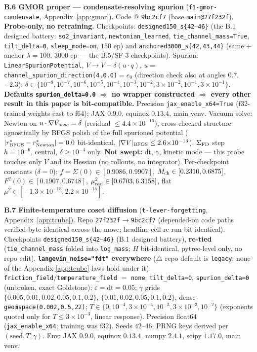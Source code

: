 \documentclass[10pt]{article}
\begin{document}
\textbf{B.6 GMOR proper --- condensate-resolving spurion} (\texttt{f1-gmor-condensate}, Appendix~\ref{app:gmor}). Code @ \texttt{9bc2cf7} (base \texttt{main@27f232f}). \textbf{Probe-only, no retraining.} Checkpoints: \texttt{designed150\_s\{42--46\}} (the B.1 designed battery: \texttt{so2\_invariant}, \texttt{newtonian\_learned}, \texttt{tie\_channel\_mass=True}, \texttt{tilt\_delta=0}, \texttt{sleep\_mode=on}, $150$ ep) and \texttt{anchored3000\_s\{42,43,44\}} (same $+$ anchor $\lambda{=}100$, $3000$ ep --- the B.5/SF-3 checkpoints). Spurion: \texttt{LinearSpurionPotential}, $V\to V-\delta(u\cdot q)$, $u=$\texttt{channel\_spurion\_direction(4,0.0)}$=e_0$ (direction check also at angles $0.7$, $-2.3$); $\delta\in\{10^{-8},10^{-7},10^{-6},10^{-5},10^{-4},10^{-3},10^{-2},3{\times}10^{-2},10^{-1},3{\times}10^{-1}\}$. \textbf{Defaults \texttt{spurion\_delta=0.0} $\Rightarrow$ no wrapper constructed $\Rightarrow$ every other result in this paper is bit-compatible.} Precision \texttt{jax\_enable\_x64=True} (f32-trained weights cast to f64); JAX $0.9.0$, equinox $0.13.4$, main venv. Vacuum solve: Newton on $u\cdot\nabla V_{\rm base}=\delta$ (residual $\le4.4{\times}10^{-16}$), cross-checked structure-agnostically by BFGS polish of the full spurioned potential ($|r^*_{\rm BFGS}-r^*_{\rm Newton}|=0.0$ bit-identical, $|\nabla V|_{\rm BFGS}\le2.6{\times}10^{-13}$). $\Sigma_{\rm FD}$ step $h{=}10^{-6}$, central, $\delta\ge10^{-4}$ only. \textbf{Not swept:} $\mathrm{dt}$, $\gamma$, kinetic mode --- this probe touches only $V$ and its Hessian (no rollouts, no integrator). Per-checkpoint constants ($\delta{=}0$): $f=\Sigma(0)\in[0.9086,0.9907]$, $M_{\rm ch}\in[0.2310,0.6875]$, $F^2(0)\in[0.1907,0.6748]$, $\mu_{\rm rad}^2\in[0.6703,6.3158]$, flat $\mu^2\in[-1.3{\times}10^{-15},2.2{\times}10^{-15}]$.

\textbf{B.7 Finite-temperature coset diffusion} (\texttt{t-lever-forgetting}, Appendix~\ref{app:tcube}). Repo \texttt{27f232f}$\to$\texttt{9bc2cf7} (depended-on code paths verified byte-identical across the move; headline cell re-run bit-identical). Checkpoints \texttt{designed150\_s\{42--46\}} (B.1 designed battery), \textbf{re-tied} (\texttt{tie\_channel\_mass} folded into \texttt{log\_mass}; $H$ bit-identical, pytree-level only, no repo edit). \textbf{\texttt{langevin\_noise="fdt"} everywhere} ($\triangle$ repo default is \texttt{legacy}; none of the Appendix-\ref{app:tcube} laws hold under it). \texttt{friction\_field}/\texttt{temperature\_field} $=$ \texttt{none}; \texttt{tilt\_delta=0}, \texttt{spurion\_delta=0} (unbroken, exact Goldstone); $\varepsilon=\mathrm{dt}=0.05$; $\gamma$ grids $\{0.005,0.01,0.02,0.05,0.1,0.2\}$, $\{0.01,0.02,0.05,0.1,0.2\}$, dense \texttt{geomspace(0.002,0.5,22)}; $T\in\{0,10^{-4},3{\times}10^{-4},10^{-3},3{\times}10^{-3},10^{-2}\}$ (exponents quoted only for $T\le3{\times}10^{-3}$, linear response). Precision float64 (\texttt{jax\_enable\_x64}; training was f32). Seeds $42$--$46$; PRNG keys derived per $(\text{seed},T,\gamma)$. Env: JAX $0.9.0$, equinox $0.13.4$, numpy $2.4.1$, scipy $1.17.0$, main venv.
\end{document}
